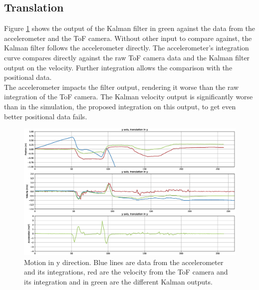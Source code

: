 \subsection{Translation}
\label{sec:kalman_translation_results}
 Figure \ref{im:meas_kalman_translation} shows the output of the Kalman filter in green against the data from the accelerometer and the ToF camera. Without other input to compare against, the Kalman filter follows the accelerometer directly. The accelerometer's integration curve compares directly against the raw ToF camera data and the Kalman filter output on the velocity. Further integration allows the comparison with the positional data.\\
The accelerometer impacts the filter output, rendering it worse than the raw integration of the ToF camera. The Kalman velocity output is significantly worse than in the simulation, the proposed integration on this output, to get even better positional data fails.
\begin{figure}[H]
  \centering
  \includegraphics[width=1.0\textwidth]{images/measurement_kalman_translation.eps}
  \caption{Motion in y direction. Blue lines are data from the accelerometer and its integrations, red are the velocity from the ToF camera and its integration and in green are the different Kalman outputs. }
  \label{im:meas_kalman_translation}
\end{figure} 
